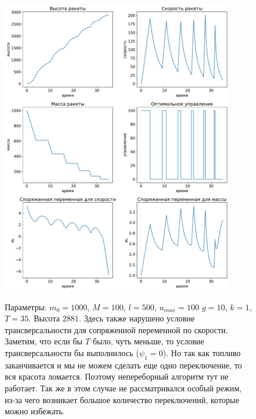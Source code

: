 \documentclass[12pt, a4paper]{article} %
\begin{document}
\begin{figure}[H]
\begin{center}
    \includegraphics[width=0.9\textwidth]{1_2.pdf}
    \label{fig:1_2}
    \caption{Параметры: $m_0=1000$, $M=100$,  $l=500$,  $u_{max}=100$
        $g=10$,  $k=1$,  $T=35$.
        Высота $2881$.
        Здесь также нарушено условие трансверсальности для сопряженной переменной по скорости.
        Заметим, что если бы $T$ было, чуть меньше, то условие трансверсальности бы выполнилось ($\psi_1 = 0$).
        Но так как топливо заканчивается и мы не можем сделать еще одно переключение, то вся красота ломается.
        Поэтому непереборный алгоритм тут не работает.
        Так же в этом случае не рассматривался особый режим, из-за чего возникает большое количество переключений, которые можно избежать.}
\end{center} 
\end{figure}
\end{document}
